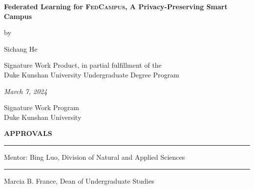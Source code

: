 \documentclass[11pt,a4paper,oneside]{report}
\newcommand{\fedcampus}{\textsc{FedCampus}\xspace}
\begin{document}
\newcommand{\authorname}{Sichang He}

\newcommand{\thetitle}{Federated Learning for \fedcampus,
    A Privacy-Preserving Smart Campus
}

\newcommand{\submissiondate}{March 7, 2024}

\newcommand{\mentor}{Bing Luo}

\newcommand{\academicunit}{Division of Natural and Applied Sciences}



\begin{titlepage}

\vspace*{\bigskipamount}

\begin{center}
{\sffamily\LARGE\bfseries\MakeUppercase\thetitle\par}

\bigskip

by

\bigskip

{\Large \authorname}

\bigskip

Signature Work Product, in partial fulfillment of the \\
Duke Kunshan University Undergraduate Degree Program

\bigskip

\emph{\submissiondate}

\bigskip

Signature Work Program \\
Duke Kunshan University

\end{center}

\vfill

\textbf{\textsf{APPROVALS}}

\bigskip\bigskip\bigskip
\hrule

Mentor: \mentor, \academicunit

\bigskip\bigskip\bigskip
\hrule

Marcia B. France, Dean of Undergraduate Studies

\end{titlepage}
\end{document}
